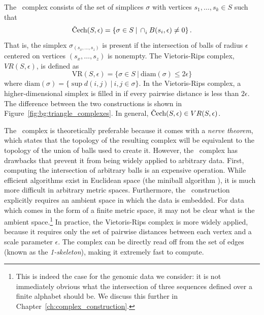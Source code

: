 The \Cech\ complex consists of the set of simplices $\sigma$ with vertices $s_{1},\ldots,s_{k}\in S$ such that
\begin{equation}
\text{\Cech}(S, \epsilon) = \left\{ \sigma\in S \:|\: \displaystyle\cap_{i}^{} B(s_{i},\epsilon)\neq0 \right\}.
\end{equation}
That is, the simplex $\sigma_{(s_{x},\ldots,s_{z})}$ is present if the intersection of balls of radius $\epsilon$ centered on vertices $(s_{x},\ldots,s_{z}	)$ is nonempty.
The Vietoris-Rips complex, $VR(S,\epsilon)$, is defined as
\begin{equation}
\mathrm{VR}(S, \epsilon) = \{ \sigma\in S\:|\:\mathrm{diam}(\sigma) \leq 2\epsilon \}
\end{equation}
where $\mathrm{diam}(\sigma)=\{ \sup d(i,j) \:|\: i,j\in\sigma \}$.
In the Vietoris-Rips complex, a higher-dimensional simplex is filled in if every pairwise distance is less than $2\epsilon$.
The difference between the two constructions is shown in Figure~\ref{fig:bg:triangle_complexes}.
In general, $\text{\Cech}(S,\epsilon)\in VR(S,\epsilon)$.

The \Cech\ complex is theoretically preferable because it comes with a \emph{nerve theorem}, which states that the topology of the resulting complex will be equivalent to the topology of the union of balls used to create it.
However, the \Cech\ complex has drawbacks that prevent it from being widely applied to arbitrary data.
First, computing the intersection of arbitrary balls is an expensive operation.
While efficient algorithms exist in Euclidean space (the miniball algorithm \cite{Gartner:1999}), it is much more difficult in arbitrary metric spaces.
Furthermore, the \Cech\ construction explicitly requires an ambient space in which the data is embedded.
For data which comes in the form of a finite metric space, it may not be clear what is the ambient space.\footnote{This is indeed the case for the genomic data we consider: it is not immediately obvious what the intersection of three sequences defined over a finite alphabet should be. We discuss this further in Chapter~\ref{ch:complex_construction}.}
In practice, the Vietoris-Rips complex is more widely applied, because it requires only the set of pairwise distances between each vertex and a scale parameter $\epsilon$.
The complex can be directly read off from the set of edges (known as the \emph{1-skeleton}), making it extremely fast to compute.

